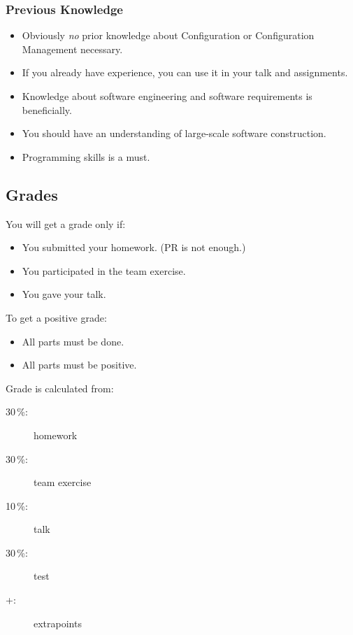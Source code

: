\documentclass{beamer}
\begin{document}
\begin{frame}
	\frametitle{Previous Knowledge}
	\begin{itemize}
		\item Obviously \textit{no} prior knowledge about Configuration or Configuration Management necessary.
		\item If you already have experience, you can use it in your talk and assignments.
		\item Knowledge about software engineering and software requirements is beneficially.
		\item You should have an understanding of large-scale software construction.
		\item Programming skills is a must.
	\end{itemize}
\end{frame}

\subsection{Grades}
\begin{frame}
	You will get a grade only if:
	\begin{itemize}
		\item You submitted your homework. (PR is not enough.)
		\item You participated in the team exercise.
		\item You gave your talk.
	\end{itemize}
\end{frame}

\begin{frame}
	To get a positive grade:
	\begin{itemize}
		\item All parts must be done.
		\item All parts must be positive.
	\end{itemize}
\end{frame}

\begin{frame}
	Grade is calculated from:
	\begin{description}
	\item[30\,\%:] homework
	\item[30\,\%:] team exercise
	\item[10\,\%:] talk
	\item[30\,\%:] test
	\item[+:] extrapoints
	\end{description}
\end{frame}
\end{document}

